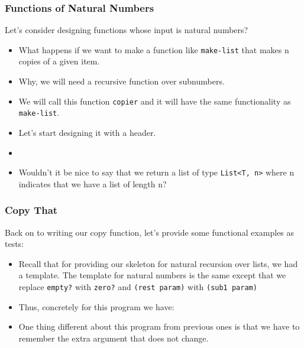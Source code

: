 \documentclass{beamer}
\begin{document}

\begin{frame}
  \frametitle{Functions of Natural Numbers}
  Let's consider designing functions whose input is natural numbers?
  \begin{itemize}
  \item<2-> What happens if we want to make a function like \texttt{make-list} that makes n copies of a given item.
  \item<3-> Why, we will need a recursive function over subnumbers.
  \item<4-> We will call this function \texttt{copier} and it will have the same functionality as \texttt{make-list}.
  \item<5-> Let's start designing it with a header.
  \item<6-> \copierHeader
  \item<7-> Wouldn't it be nice to say that we return a list of
    type \texttt{List<T, n>} where n indicates that
    we have a list of length n?
  \end{itemize}
\end{frame}



\begin{frame}
  \frametitle{Copy That}
  Back on to writing our copy function, let's provide some functional
  examples as tests:
  \CopierExamples
  \begin{itemize}
  \item<2-> Recall that for providing our skeleton for natural recursion over lists, we had a template. The template for natural numbers is the same except that we replace \texttt{empty?} with \texttt{zero?} and \texttt{(rest param)} with \texttt{(sub1 param)}
  \item<3-> Thus, concretely for this program we have:
    \CopierSkeleton
  \item<4-> One thing different about this program from previous ones
    is that we have to remember the extra argument that does not change.  
  \end{itemize}
\end{frame}
\end{document}
